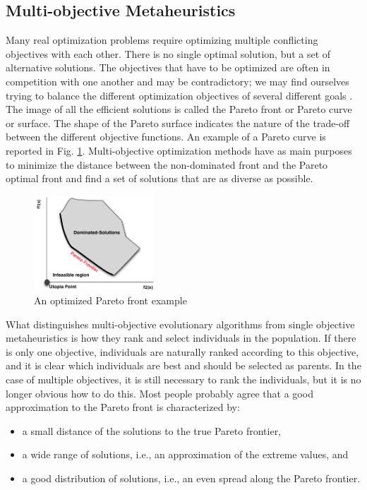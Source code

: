 \documentclass[espaco=umemeio,chapter=TITLE,twoside,openright]{abnt}
\begin{document}
\subsection{Multi-objective Metaheuristics}

Many real optimization problems require optimizing multiple conflicting objectives with each other. There is no single optimal solution, but a set of alternative solutions. The objectives that have to be optimized are often in competition with one another and may be contradictory; we may find ourselves trying to balance the different optimization objectives of several different goals \cite{Harman2010}. The image of all the efficient solutions is called the Pareto front or Pareto curve or surface. The shape of the Pareto surface indicates the nature of the trade-off between the different objective functions. An example of a Pareto curve is reported in Fig. \ref{fig:pareto1}. Multi-objective optimization methods have as main purposes to minimize the distance between the non-dominated front and the Pareto optimal front and find a set of solutions that are as diverse as possible.

\begin{figure}[h]
\centering
\includegraphics[width=0.4\textwidth]{./images/paretofront.png}
\caption{An optimized Pareto front example}
\label{fig:pareto1}
\end{figure}

What distinguishes multi-objective evolutionary algorithms from single objective metaheuristics is how they rank and select individuals in the population. If there is only one objective, individuals are naturally ranked according to this objective, and it is clear which individuals are best and should be selected as
parents. In the case of multiple objectives, it is still necessary to rank the individuals, but it is no longer obvious how to do this. Most people probably agree that a good approximation to the Pareto front is characterized by:

\begin{itemize}
\item  a small distance of the solutions to the true Pareto frontier,
\item  a wide range of solutions, i.e., an approximation
of the extreme values, and
\item a good distribution of solutions, i.e., an even
spread along the Pareto frontier.
\end{itemize}
\end{document}
